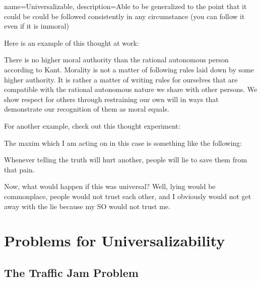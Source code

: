 {
  name=Universalizable,
  description={Able to be generalized to the point that it could be could be followed consistently in any circumstance (you can follow it even if it is immoral)}
}


Here is an example of this thought at work:


There is no higher moral authority than the rational autonomous person according to Kant. Morality is not a matter of following rules laid down by some higher authority. It is rather a matter of writing rules for ourselves that are compatible with the rational autonomous nature we share with other persons. We show respect for others through restraining our own will in ways that demonstrate our recognition of them as moral equals.

For another example, check out this thought experiment:


The maxim which I am acting on in this case is something like the following:
\begin{center}
Whenever telling the truth will hurt another, people will lie to save them from that pain.
\end{center}
Now, what would happen if this was universal? Well, lying would be commonplace, people would not trust each other, and I obviously would not get away with the lie because my SO would not trust me.
\section{Problems for Universalizability}
\subsection{The Traffic Jam Problem}

